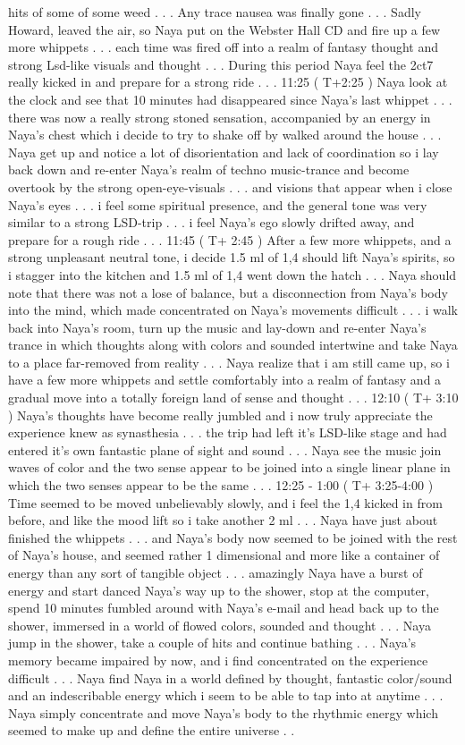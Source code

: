 \documentclass[12pt]{book}
\begin{document}
hits of some of some weed . . .  Any trace nausea was finally gone . . .  Sadly Howard, leaved the air, so Naya put on the Webster Hall CD and fire up a few more whippets . . .  each time was fired off into a realm of fantasy thought and strong Lsd-like visuals and thought . . .  During this period Naya feel the 2ct7 really kicked in and prepare for a strong ride . . .  11:25 ( T+2:25 ) Naya look at the clock and see that 10 minutes had disappeared since Naya's last whippet . . .  there was now a really strong stoned sensation, accompanied by an energy in Naya's chest which i decide to try to shake off by walked around the house . . .  Naya get up and notice a lot of disorientation and lack of coordination so i lay back down and re-enter Naya's realm of techno music-trance and become overtook by the strong open-eye-visuals . . .  and visions that appear when i close Naya's eyes . . .  i feel some spiritual presence, and the general tone was very similar to a strong LSD-trip . . .  i feel Naya's ego slowly drifted away, and prepare for a rough ride . . .  11:45 ( T+ 2:45 ) After a few more whippets, and a strong unpleasant neutral tone, i decide 1.5 ml of 1,4 should lift Naya's spirits, so i stagger into the kitchen and 1.5 ml of 1,4 went down the hatch . . .  Naya should note that there was not a lose of balance, but a disconnection from Naya's body into the mind, which made concentrated on Naya's movements difficult . . .  i walk back into Naya's room, turn up the music and lay-down and re-enter Naya's trance in which thoughts along with colors and sounded intertwine and take Naya to a place far-removed from reality . . .  Naya realize that i am still came up, so i have a few more whippets and settle comfortably into a realm of fantasy and a gradual move into a totally foreign land of sense and thought . . .  12:10 ( T+ 3:10 ) Naya's thoughts have become really jumbled and i now truly appreciate the experience knew as synasthesia . . .  the trip had left it's LSD-like stage and had entered it's own fantastic plane of sight and sound . . .  Naya see the music join waves of color and the two sense appear to be joined into a single linear plane in which the two senses appear to be the same . . .  12:25 - 1:00 ( T+ 3:25-4:00 ) Time seemed to be moved unbelievably slowly, and i feel the 1,4 kicked in from before, and like the mood lift so i take another 2 ml . . .  Naya have just about finished the whippets . . .  and Naya's body now seemed to be joined with the rest of Naya's house, and seemed rather 1 dimensional and more like a container of energy than any sort of tangible object . . .  amazingly Naya have a burst of energy and start danced Naya's way up to the shower, stop at the computer, spend 10 minutes fumbled around with Naya's e-mail and head back up to the shower, immersed in a world of flowed colors, sounded and thought . . .  Naya jump in the shower, take a couple of hits and continue bathing . . .  Naya's memory became impaired by now, and i find concentrated on the experience difficult . . .  Naya find Naya in a world defined by thought, fantastic color/sound and an indescribable energy which i seem to be able to tap into at anytime . . .  Naya simply concentrate and move Naya's body to the rhythmic energy which seemed to make up and define the entire universe . . 
\end{document}
